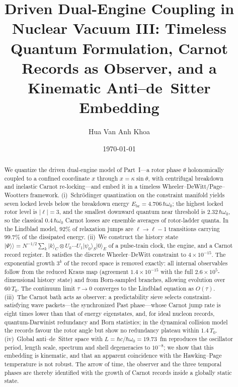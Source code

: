 \documentclass[aps,prc,twocolumn,superscriptaddress,amsmath,amssymb,nofootinbib]{revtex4-2}
\newcommand{\ket}[1]{\lvert #1\rangle}
\newcommand{\kket}[1]{\lvert #1\rangle\rangle}
\begin{document}
\title{Driven Dual-Engine Coupling in Nuclear Vacuum III: Timeless Quantum Formulation, Carnot Records as Observer, and a Kinematic Anti--de~Sitter Embedding}

\author{Hua Van Anh Khoa}

\date{\today}

\begin{abstract}
We quantize the driven dual-engine model of Part~I---a rotor phase $\theta$ holonomically coupled to a confined coordinate $x$ through $x=\kappa\sin\theta$, with centrifugal breakdown and inelastic Carnot re-locking---and embed it in a timeless Wheeler--DeWitt/Page--Wootters framework. (i)~Schr\"odinger quantization on the constraint manifold yields seven locked levels below the breakdown energy $E_{\text{br}}=4.706\,\hbar\omega_0$; the highest locked rotor level is $|\ell|=3$, and the smallest downward quantum near threshold is $2.32\,\hbar\omega_0$, so the classical $0.4\,\hbar\omega_0$ Carnot losses are ensemble averages of rotor-ladder quanta. In the Lindblad model, $92\%$ of relaxation jumps are $\ell\to\ell-1$ transitions carrying $99.7\%$ of the dissipated energy. (ii)~We construct the history state $\kket{\Psi}=N^{-1/2}\sum_k\ket{k}_C\otimes U_k\cdots U_1\ket{\psi_0}_S\ket{0}_E$ of a pulse-train clock, the engine, and a Carnot record register. It satisfies the discrete Wheeler--DeWitt constraint to $4\times10^{-15}$. The exponential growth $3^k$ of the record space is removed exactly: all internal observables follow from the reduced Kraus map (agreement $1.4\times10^{-15}$ with the full $2.6\times10^5$-dimensional history state) and from Born-sampled branches, allowing evolution over $60\,T_0$. The continuum limit $\tau\to0$ converges to the Lindblad equation as $O(\tau)$. (iii)~The Carnot bath acts as observer: a predictability sieve selects constraint-satisfying wave packets---the synchronized Past phase---whose Carnot jump rate is eight times lower than that of energy eigenstates, and, for ideal nucleon records, quantum-Darwinist redundancy and Born statistics; in the dynamical collision model the records favour the rotor angle but show no redundancy plateau within $1.4\,T_0$. (iv)~Global anti--de~Sitter space with $L=\hbar c/\hbar\omega_0=19.73$~fm reproduces the oscillator period, length scale, spectrum and shell degeneracies to $10^{-8}$; we show that this embedding is kinematic, and that an apparent coincidence with the Hawking--Page temperature is not robust. The arrow of time, the observer and the three temporal phases are thereby identified with the growth of Carnot records inside a globally static state.
\end{abstract}
\end{document}

